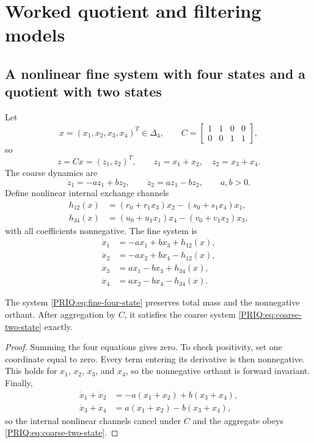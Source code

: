 \section{Worked quotient and filtering models}\label{PRIQ:sec:examples}

\subsection{A nonlinear fine system with four states and a quotient with two states}
Let
\[
  x=(x_1,x_2,x_3,x_4)^T\in\Delta_4,
  \qquad
  C=
  \begin{bmatrix}
  1&1&0&0\\
  0&0&1&1
  \end{bmatrix},
\]
so
\[
  z=Cx=(z_1,z_2)^T,
  \qquad
  z_1=x_1+x_2,
  \quad
  z_2=x_3+x_4.
\]
The coarse dynamics are
\begin{equation}\label{PRIQ:eq:coarse-two-state}
  \dot z_1=-az_1+bz_2,
  \qquad
  \dot z_2=az_1-bz_2,
  \qquad a,b>0.
\end{equation}
Define nonlinear internal exchange channels
\begin{align}
  h_{12}(x)
  &=
  (r_0+r_1x_3)x_2-(s_0+s_1x_4)x_1,
  \label{PRIQ:eq:h12}\\
  h_{34}(x)
  &=
  (u_0+u_1x_1)x_4-(v_0+v_1x_2)x_3,
  \label{PRIQ:eq:h34}
\end{align}
with all coefficients nonnegative.  The fine system is
\begin{equation}\label{PRIQ:eq:fine-four-state}
\begin{aligned}
  \dot x_1&=-ax_1+bx_3+h_{12}(x),\\
  \dot x_2&=-ax_2+bx_4-h_{12}(x),\\
  \dot x_3&= ax_1-bx_3+h_{34}(x),\\
  \dot x_4&= ax_2-bx_4-h_{34}(x).
\end{aligned}
\end{equation}

\begin{PRIQproposition}\label{PRIQ:prop:hidden-exchange-quotient}
The system \eqref{PRIQ:eq:fine-four-state} preserves total mass and the nonnegative orthant.  After aggregation by $C$, it satisfies the coarse system \eqref{PRIQ:eq:coarse-two-state} exactly.
\end{PRIQproposition}

\begin{proof}
Summing the four equations gives zero.  To check positivity, set one coordinate equal to zero.  Every term entering its derivative is then nonnegative.  This holds for $x_1$, $x_2$, $x_3$, and $x_4$, so the nonnegative orthant is forward invariant.  Finally,
\begin{align*}
  \dot x_1+\dot x_2
  &=-a(x_1+x_2)+b(x_3+x_4),\\
  \dot x_3+\dot x_4
  &=a(x_1+x_2)-b(x_3+x_4),
\end{align*}
so the internal nonlinear channels cancel under $C$ and the aggregate obeys \eqref{PRIQ:eq:coarse-two-state}.
\end{proof}

